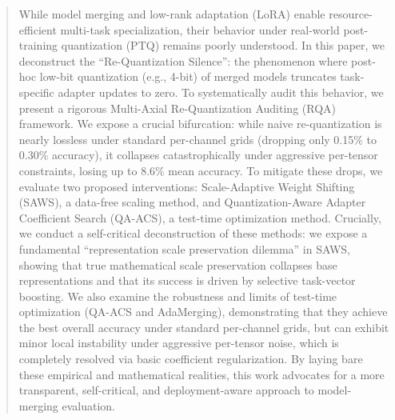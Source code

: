 \begin{abstract}
  While model merging and low-rank adaptation (LoRA) enable resource-efficient multi-task specialization, their behavior under real-world post-training quantization (PTQ) remains poorly understood. In this paper, we deconstruct the ``Re-Quantization Silence'': the phenomenon where post-hoc low-bit quantization (e.g., 4-bit) of merged models truncates task-specific adapter updates to zero. To systematically audit this behavior, we present a rigorous Multi-Axial Re-Quantization Auditing (RQA) framework. We expose a crucial bifurcation: while naive re-quantization is nearly lossless under standard per-channel grids (dropping only 0.15\% to 0.30\% accuracy), it collapses catastrophically under aggressive per-tensor constraints, losing up to 8.6\% mean accuracy. To mitigate these drops, we evaluate two proposed interventions: Scale-Adaptive Weight Shifting (SAWS), a data-free scaling method, and Quantization-Aware Adapter Coefficient Search (QA-ACS), a test-time optimization method. Crucially, we conduct a self-critical deconstruction of these methods: we expose a fundamental ``representation scale preservation dilemma'' in SAWS, showing that true mathematical scale preservation collapses base representations and that its success is driven by selective task-vector boosting. We also examine the robustness and limits of test-time optimization (QA-ACS and AdaMerging), demonstrating that they achieve the best overall accuracy under standard per-channel grids, but can exhibit minor local instability under aggressive per-tensor noise, which is completely resolved via basic coefficient regularization. By laying bare these empirical and mathematical realities, this work advocates for a more transparent, self-critical, and deployment-aware approach to model-merging evaluation.
\end{abstract}